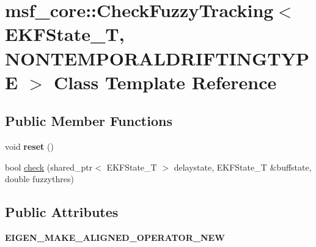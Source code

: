 \hypertarget{classmsf__core_1_1CheckFuzzyTracking}{\section{msf\-\_\-core\-:\-:Check\-Fuzzy\-Tracking$<$ E\-K\-F\-State\-\_\-\-T, N\-O\-N\-T\-E\-M\-P\-O\-R\-A\-L\-D\-R\-I\-F\-T\-I\-N\-G\-T\-Y\-P\-E $>$ Class Template Reference}
\label{classmsf__core_1_1CheckFuzzyTracking}
}
\subsection*{Public Member Functions}
\begin{DoxyCompactItemize}
\item 
\hypertarget{classmsf__core_1_1CheckFuzzyTracking_a68609f438370a3c2a39e81f3d996ef9a}{void {\bfseries reset} ()}\label{classmsf__core_1_1CheckFuzzyTracking_a68609f438370a3c2a39e81f3d996ef9a}

\item 
bool \hyperlink{classmsf__core_1_1CheckFuzzyTracking_a3ab7f56a13cc8b8a80c1a97b9be9e8ad}{check} (shared\-\_\-ptr$<$ E\-K\-F\-State\-\_\-\-T $>$ delaystate, E\-K\-F\-State\-\_\-\-T \&buffstate, double fuzzythres)
\end{DoxyCompactItemize}
\subsection*{Public Attributes}
\begin{DoxyCompactItemize}
\item 
\hypertarget{classmsf__core_1_1CheckFuzzyTracking_ae9cbaa66c0aca9cf4264d3017b46a785}{{\bfseries E\-I\-G\-E\-N\-\_\-\-M\-A\-K\-E\-\_\-\-A\-L\-I\-G\-N\-E\-D\-\_\-\-O\-P\-E\-R\-A\-T\-O\-R\-\_\-\-N\-E\-W}}\label{classmsf__core_1_1CheckFuzzyTracking_ae9cbaa66c0aca9cf4264d3017b46a785}

\end{DoxyCompactItemize}



